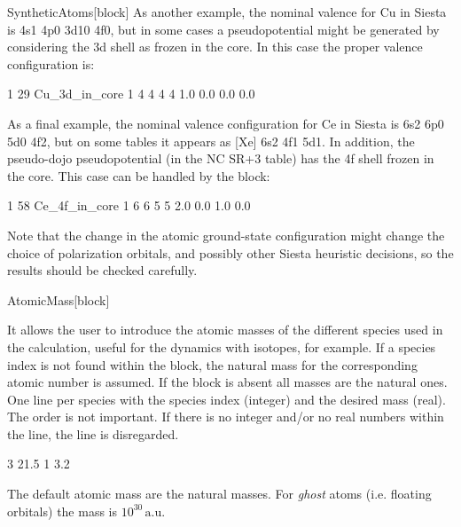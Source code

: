 \begin{fdfentry}{SyntheticAtoms}[block]
    As another example, the nominal valence for Cu in Siesta is
    4s1 4p0 3d10 4f0, but in some cases a pseudopotential might
    be generated by considering the 3d shell as frozen in the core.
    In this case the proper valence configuration is:
  
    \begin{fdfexample}
          1   29 Cu_3d_in_core
       1
         4 4 4 4
         1.0 0.0 0.0 0.0
    \end{fdfexample}
  
    As a final example, the nominal valence configuration for Ce in
    Siesta is 6s2 6p0 5d0 4f2, but on some tables it appears as [Xe] 6s2
    4f1 5d1. In addition, the pseudo-dojo pseudopotential (in the NC SR+3 table) has
    the 4f shell frozen in the core. This case can be handled by the
    block:
  
    \begin{fdfexample}
          1   58 Ce_4f_in_core
       1
         6 6 5 5
         2.0 0.0 1.0 0.0
    \end{fdfexample}
  
    Note that the change in the atomic ground-state configuration might
    change the choice of polarization orbitals, and possibly other
    Siesta heuristic decisions, so the results should be checked
    carefully.
  
  \end{fdfentry}
  
  \begin{fdfentry}{AtomicMass}[block]
  
    It allows the user to introduce the atomic masses of the different
    species used in the calculation, useful for the dynamics with
    isotopes, for example. If a species index is not
    found within the block, the natural mass for the corresponding
    atomic number is assumed. If the block is absent all masses are the
    natural ones. One line per species with the species index (integer)
    and the desired mass (real). The order is not important. If there is
    no integer and/or no real numbers within the line, the line is
    disregarded.
  
    \begin{fdfexample}
          3  21.5
          1  3.2
    \end{fdfexample}
  
    The default atomic mass are the natural masses. For \emph{ghost}
    atoms (i.e. floating orbitals) the mass is $10^{30}\,\mathrm{a.u.}$
  
  \end{fdfentry}
  
  
  